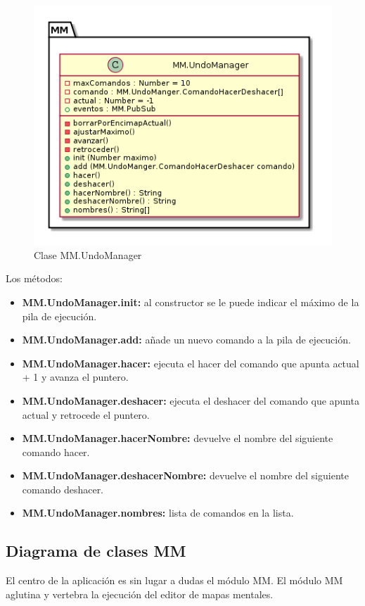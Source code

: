 \begin{figure}[tbph]
\centering
\includegraphics[width=0.7\linewidth]{imagenes/diagrama-clase-mm-undomanager}
\caption{Clase MM.UndoManager}
\label{fig:diagrama-clase-mm-undomanager}
\end{figure}

Los métodos:
\begin{itemize}
\item \textbf{MM.UndoManager.init:} al constructor se le puede indicar el máximo de la pila 
de ejecución.
\item \textbf{MM.UndoManager.add:} añade un nuevo comando a la pila de ejecución.
\item \textbf{MM.UndoManager.hacer:} ejecuta el hacer del comando que apunta actual + 1 y avanza 
el puntero. 
\item \textbf{MM.UndoManager.deshacer:} ejecuta el deshacer del comando que apunta actual y 
retrocede el puntero.
\item \textbf{MM.UndoManager.hacerNombre:} devuelve el nombre del siguiente comando hacer.
\item \textbf{MM.UndoManager.deshacerNombre:} devuelve el nombre del siguiente comando deshacer.
\item \textbf{MM.UndoManager.nombres:} lista de comandos en la lista.
\end{itemize}






\subsection{Diagrama de clases MM}

El centro de la aplicación es sin lugar a dudas el módulo MM. El módulo MM aglutina y vertebra la 
ejecución del editor de mapas mentales. 

